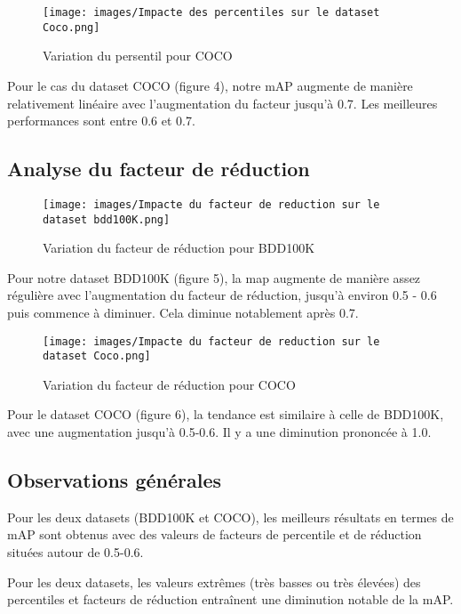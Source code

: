 \documentclass{article}
\begin{document}
\begin{figure}[htp]
    \centering
    \texttt{[image: images/Impacte des percentiles sur le dataset Coco.png]}
    \caption{Variation du persentil pour COCO}
    \label{fig:galaxy}
\end{figure}

Pour le cas du dataset COCO (figure 4), notre mAP augmente de manière relativement linéaire avec l'augmentation du facteur jusqu'à 0.7. Les meilleures performances sont entre 0.6 et 0.7.


\subsection{Analyse du facteur de réduction}

\begin{figure}
    \centering
    \texttt{[image: images/Impacte du facteur de reduction sur le dataset bdd100K.png]}
    \caption{Variation du facteur de réduction pour BDD100K}
    \label{fig:enter-label}
\end{figure}

Pour notre dataset BDD100K (figure 5), la map augmente de manière assez régulière avec l'augmentation du facteur de réduction, jusqu'à environ 0.5 - 0.6 puis commence à diminuer. Cela diminue notablement après 0.7.


\begin{figure}
    \centering
    \texttt{[image: images/Impacte du facteur de reduction sur le dataset Coco.png]}
    \caption{Variation du facteur de réduction pour COCO}
    \label{fig:enter-label}
\end{figure}

Pour le dataset COCO (figure 6), la tendance est similaire à celle de BDD100K, avec une augmentation jusqu'à 0.5-0.6. Il y a une diminution prononcée à 1.0.


\newpage
\subsection{Observations générales}

Pour les deux datasets (BDD100K et COCO), les meilleurs résultats en termes de mAP sont obtenus avec des valeurs de facteurs de percentile et de réduction situées autour de 0.5-0.6.

Pour les deux datasets, les valeurs extrêmes (très basses ou très élevées) des percentiles et facteurs de réduction entraînent une diminution notable de la mAP.
\end{document}
